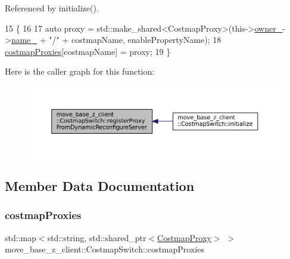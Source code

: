 Referenced by initialize().


\begin{DoxyCode}
15 \{
16 
17     \textcolor{keyword}{auto} proxy = std::make\_shared<CostmapProxy>(this->\hyperlink{classmove__base__z__client_1_1CostmapSwitch_a00517c28045327007d7b9335c9b433ed}{owner\_}->\hyperlink{classsmacc_1_1client__bases_1_1SmaccActionClientBase_a7f2e1834e915bdf7ae9db8b90b4597e6}{name\_} + \textcolor{stringliteral}{"/"} + costmapName, 
      enablePropertyName);
18     \hyperlink{classmove__base__z__client_1_1CostmapSwitch_ab9b33bc5774b41e5898718ffdcfcbc25}{costmapProxies}[costmapName] = proxy;
19 \}
\end{DoxyCode}
Here is the caller graph for this function\+:
\nopagebreak
\begin{figure}[H]
\begin{center}
\leavevmode
\includegraphics[width=350pt]{classmove__base__z__client_1_1CostmapSwitch_a0282cb1651dd50803e3af0de1436635f_icgraph}
\end{center}
\end{figure}


\subsection{Member Data Documentation}
\mbox{\label{classmove__base__z__client_1_1CostmapSwitch_ab9b33bc5774b41e5898718ffdcfcbc25}} 
\subsubsection{\texorpdfstring{costmap\+Proxies}{costmapProxies}}
{\footnotesize\ttfamily std\+::map$<$std\+::string, std\+::shared\+\_\+ptr$<$\hyperlink{classmove__base__z__client_1_1CostmapProxy}{Costmap\+Proxy}$>$ $>$ move\+\_\+base\+\_\+z\+\_\+client\+::\+Costmap\+Switch\+::costmap\+Proxies\hspace{0.3cm}{\ttfamily [private]}}




